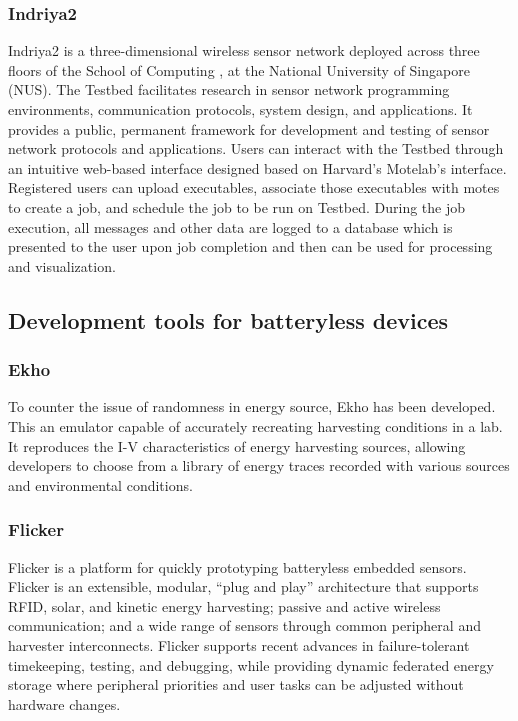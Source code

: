 \documentclass[]{article}
\begin{document}
\subsubsection{Indriya2}

Indriya2 \cite{indriya2} is a three-dimensional wireless sensor network deployed across three floors of the School of Computing , at the National University of Singapore (NUS). The Testbed facilitates research in sensor network programming environments, communication protocols, system design, and applications. It provides a public, permanent framework for development and testing of sensor network protocols and applications. Users can interact with the Testbed through an intuitive web-based interface designed based on Harvard's Motelab's interface. Registered users can upload executables, associate those executables with motes to create a job, and schedule the job to be run on Testbed. During the job execution, all messages and other data are logged to a database which is presented to the user upon job completion and then can be used for processing and visualization. 

\subsection{Development tools for batteryless devices}

\subsubsection{Ekho}

To counter the issue of randomness in energy source, Ekho \cite{ekho} has been developed. This an emulator capable of accurately recreating harvesting conditions in a lab. It reproduces the I-V characteristics of energy harvesting sources, allowing developers to choose from a library of energy traces recorded with various sources and environmental conditions.

\subsubsection{Flicker}
Flicker \cite{flicker} is a platform for quickly prototyping batteryless embedded sensors. Flicker is an extensible, modular, “plug and play” architecture that supports RFID, solar, and kinetic energy harvesting; passive and active wireless communication; and a wide range of sensors through common peripheral and harvester interconnects. Flicker supports recent advances in failure-tolerant timekeeping, testing, and debugging, while providing dynamic federated energy storage where peripheral priorities and user tasks can be adjusted without hardware changes.
\end{document}
